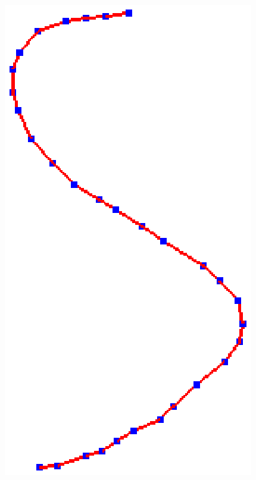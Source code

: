 \begin{figure} [htbp]
{\begin{minipage}[b]{0.2\textwidth}
      \includegraphics[scale=0.3]{figs/f3.strokepre-2.eps}
    \end{minipage}}
  \subfigure[]{
    \centering
    \label{fig:alstrokeproc:c}
    \begin{minipage}[b]{0.2\textwidth}
      \centering

\end{minipage}}
\end{figure}
